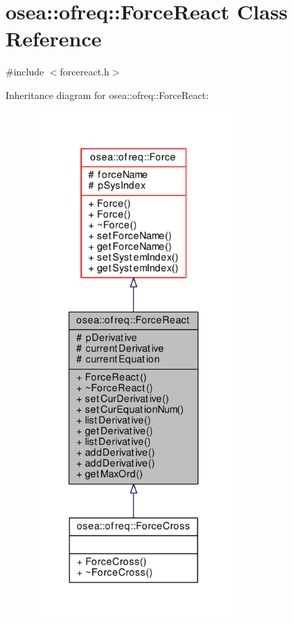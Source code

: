 \hypertarget{classosea_1_1ofreq_1_1_force_react}{\section{osea\-:\-:ofreq\-:\-:Force\-React Class Reference}
\label{classosea_1_1ofreq_1_1_force_react}
}


{\ttfamily \#include $<$forcereact.\-h$>$}



Inheritance diagram for osea\-:\-:ofreq\-:\-:Force\-React\-:\nopagebreak
\begin{figure}[H]
\begin{center}
\leavevmode
\includegraphics[height=550pt]{classosea_1_1ofreq_1_1_force_react__inherit__graph}
\end{center}
\end{figure}
